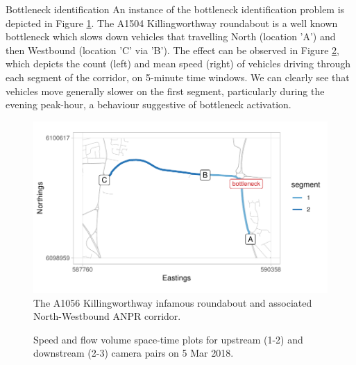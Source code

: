 \documentclass[final]{beamer}
\newlength{\colwidth}
\begin{document}
\begin{frame}[t]
\begin{columns}[t]
\begin{column}{\colwidth}
\begin{block}{Bottleneck identification }
    An instance of the bottleneck identification problem is depicted in
    Figure \ref{fig:motivating_example_map}. The A1504 Killingworthway
    roundabout is a well known bottleneck which slows down vehicles that
    travelling North (location 'A') and then Westbound (location 'C' via 'B').
    The effect can be observed in Figure \ref{fig:motivating_example_1dayplots},
    which depicts the count (left) and mean speed (right) of vehicles driving
    through each segment of the corridor, on 5-minute time windows. We can
    clearly see that vehicles move generally slower on the first segment,
    particularly during the evening peak-hour, a behaviour suggestive of
    bottleneck activation.

    \begin{figure}
      \centering
      \includegraphics[width=0.55\linewidth]{MOTIVATING-EXAMPLE-map.pdf}
      \caption{The A1056 Killingworthway infamous roundabout and associated
              North-Westbound ANPR corridor.}
      \label{fig:motivating_example_map}
    \end{figure}

    \vspace{-0.75cm}

    \begin{figure}
      \centering
      \caption{Speed and flow volume space-time plots for upstream
               (1-2) and downstream (2-3) camera pairs on 5 Mar 2018.}
      \label{fig:motivating_example_1dayplots}
    \end{figure}


\end{block}
\end{column}
\end{columns}
\end{frame}
\end{document}
